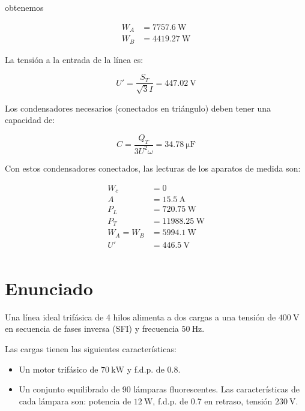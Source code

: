 obtenemos

\begin{align*}
  W_A &= \SI{7757.6}{\watt}\\
  W_B &= \SI{4419.27}{\watt}
\end{align*}

La tensión a la entrada de la línea es:

\begin{equation*}
  U' = \frac{S_T}{\sqrt{3} I} = \SI{447.02}{\volt}
\end{equation*}

Los condensadores necesarios (conectados en triángulo) deben tener una
capacidad de:

\begin{equation*}
  C = \frac{Q_T}{3U^2\omega} = \SI{34.78}{\micro\farad}
\end{equation*}

Con estos condensadores conectados, las lecturas de los aparatos de
medida son:

\begin{align*}
  W_c &= 0\\
  A &= \SI{15.5}{\ampere}\\
  P_L &= \SI{720.75}{\watt}\\
  P_T &= \SI{11988.25}{\watt}\\
  W_A = W_B &= \SI{5994.1}{\watt}\\
  U' &= \SI{446.5}{\volt}\\  
\end{align*}



\section{Enunciado}

Una línea ideal trifásica de 4 hilos alimenta a dos cargas a una
tensión de $\SI{400}{\volt}$ en secuencia de fases inversa (SFI) y
frecuencia $\SI{50}{\hertz}$.

Las cargas tienen las siguientes características:

\begin{itemize}
\item Un motor trifásico de $\SI{70}{\kilo\watt}$ y f.d.p. de 0.8.
\item Un conjunto equilibrado de 90 lámparas fluorescentes. Las
  características de cada lámpara son: potencia de $\SI{12}{\watt}$,
  f.d.p. de 0.7 en retraso, tensión $\SI{230}{\volt}$.
\end{itemize}

